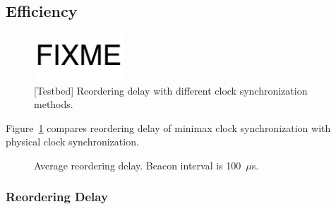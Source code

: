 \subsection{Efficiency}
\begin{figure}[t]
\centering
\includegraphics[width=0.3\textwidth]{images/fixme.pdf}
\caption{[Testbed] Reordering delay with different clock synchronization methods.}
\label{fig:clock-sync}
\end{figure}

Figure~\ref{fig:clock-sync} compares reordering delay of minimax clock synchronization with physical clock synchronization.



\begin{figure}[t]
\centering
	\hspace{0.01\textwidth}
	\caption{Average reordering delay. Beacon interval is 100~$\mu$s.}
    \vspace{-5pt}
\label{fig:reorder-delay}
\end{figure}

\subsubsection{Reordering Delay}
\label{sec:eval-delay}

